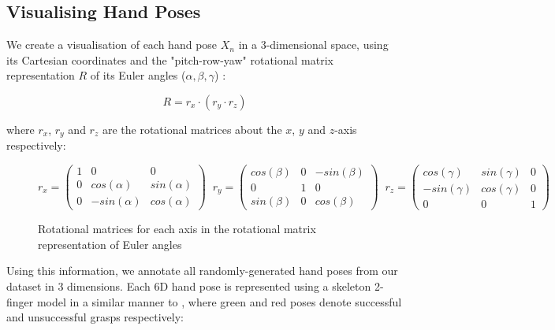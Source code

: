 \documentclass[11pt, a4paper]{report}
\begin{document}
\subsection{Visualising Hand Poses}
\label{sec:4.3.2}
We create a visualisation of each hand pose $X_n$ in a 3-dimensional space, using its Cartesian coordinates and the "pitch-row-yaw" rotational matrix representation $R$ of its Euler angles ($\alpha,\beta,\gamma$) \cite{weisstein}:

\begin{equation}
    R=r_x\cdot(r_y\cdot r_z)
\end{equation}

\noindent where $r_x$, $r_y$ and $r_z$ are the rotational matrices about the $x$, $y$ and $z$-axis respectively:

\begin{figure}[H]
    \centering
    \begin{equation*}
        r_x = \begin{pmatrix}1&0&0 \\ 0&cos(\alpha)&sin(\alpha) \\ 0&-sin(\alpha)&cos(\alpha)\end{pmatrix}\;\;
        r_y = \begin{pmatrix}cos(\beta)&0&-sin(\beta) \\ 0&1&0 \\ sin(\beta)&0&cos(\beta)\end{pmatrix}\;\;
        r_z = \begin{pmatrix}cos(\gamma)&sin(\gamma)&0 \\ -sin(\gamma)&cos(\gamma)&0 \\ 0&0&1 \end{pmatrix}
    \end{equation*}
    \caption{Rotational matrices for each axis in the rotational matrix representation of Euler angles}
    \label{fig:4.3}
\end{figure}

\noindent Using this information, we annotate all randomly-generated hand poses from our dataset in 3 dimensions. Each 6D hand pose is represented using a skeleton 2-finger model in a similar manner to \cite{Bekiroglu2012LearningTA}, where green and red poses denote successful and unsuccessful grasps respectively:
\end{document}
